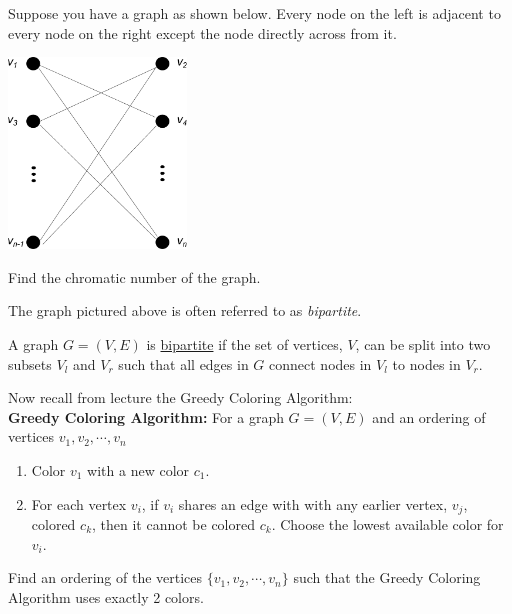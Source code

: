 \documentclass[12pt,twoside]{article}
\begin{document}
\begin{problem}{20}
Suppose you have a graph as shown below. Every node on the left is adjacent 
to every node on the right except the node directly across from it.
\begin{center}
\includegraphics[height = 2in]{coloring}
\end{center}

\bparts

Find the chromatic number of the graph.


The graph pictured above is often referred to as \textit{bipartite}.

\begin{definition*}
A graph $G = (V,E)$ is \underline{bipartite} if the set of vertices, $V$, can 
be split into two subsets $V_l$ and $V_r$ such that all edges in $G$ connect 
nodes in $V_l$ to nodes in $V_r$. 
\end{definition*}

Now recall from lecture the Greedy Coloring Algorithm: \\
\textbf{Greedy Coloring Algorithm:} For a graph $G = (V,E)$ and an ordering 
of vertices $v_1, v_2, \cdots, v_n$
\begin{enumerate}
\item Color $v_1$ with a new color $c_1$.
\item For each vertex $v_i$, if $v_i$ shares an edge with with any earlier vertex,
    $v_j$, colored $c_k$, then it cannot be colored $c_k$. Choose the lowest available
    color for $v_i$.
\end{enumerate}

Find an ordering of the vertices $\{v_1, v_2, \cdots, v_n\}$ such that the 
Greedy Coloring Algorithm uses exactly 2 colors.


\end{problem}
\end{document}
